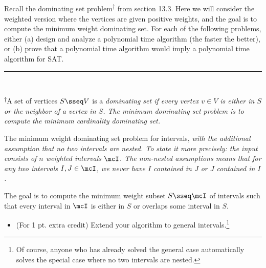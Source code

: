 \documentclass{article}
\begin{document}
\setcounter{section}{13}
\setcounter{exercise}{6}
 Recall the dominating set problem\textsuperscript{\hyperref[fn:dmset]{\( \dagger \)}} from section 13.3.
  Here we will consider the weighted version where the vertices are given positive weights, and the goal is to compute the minimum weight dominating set.
  For each of the following problems, either (a) design and analyze a polynomial time algorithm (the faster the better), or (b) prove that a polynomial time algorithm would imply a polynomial time algorithm for SAT. \\
\noindent\rule{2in}{0.4pt} \\
\parbox{\linewidth}{\small \textsuperscript{\label{fn:dmset}\( \dagger \)}A set of vertices \( S \sseq V \) is a \it{dominating set} if every vertex \( v \in V \) is either in \( S \) or the neighbor of a vertex in \( S \).
  The minimum dominating set problem is to compute the minimum cardinality dominating set.}

\begin{subexercise}
  The minimum weight dominating set problem for intervals, \it{with the additional assumption that} no two intervals are nested.
  To state it more precisely: the input consists of \( n \) weighted intervals \( \mcI \).
  The non-nested assumptions means that for any two intervals \( I, J \in \mcI \), we never have \( I \) contained in \( J \) or \( J \) contained in \( I \).

  The goal is to compute the minimum weight subset \( S \sseq \mcI \) of intervals such that every interval in \( \mcI \) is either in \( S \) or overlaps some interval in \( S \).
\begin{itemize}
  \item (For 1 pt. extra credit) Extend your algorithm to general intervals.\footnote[8]{Of course, anyone who has already solved the general case automatically solves the special case where no two intervals are nested.}
\end{itemize}
\end{subexercise}
\end{document}
